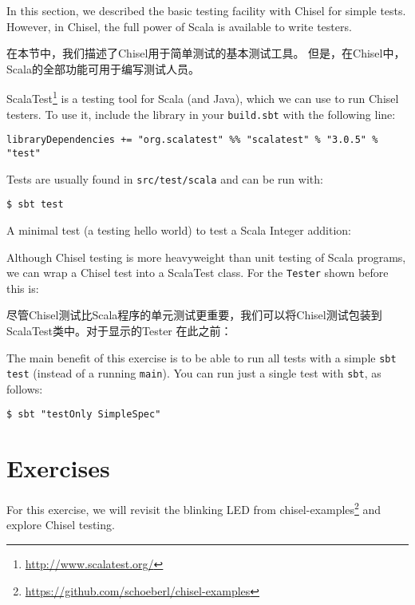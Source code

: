 \documentclass[%
    10pt,
    headinclude, footexclude,
    openright, %
    notitlepage,
    cleardoubleempty,
    headsepline,
    pointlessnumbers,
    bibtotoc, idxtotoc,
    ]{scrbook}
\newcommand{\code}[1]{{\small{\texttt{#1}}}}
\newcommand{\todo}[1]{{\emph{TODO: #1}}}
\newcommand{\myref}[2]{\href{#1}{#2}}
\renewcommand{\myref}[2]{{#2}{\footnote{\url{#1}}}}
\renewcommand{\todo}[1]{}
\begin{document}
In this section, we described the basic testing facility with Chisel for simple tests.
However, in Chisel, the full power of Scala is available to write testers.
\todo{Have a link to the not yet written section for: We will show these possibilities later.}

在本节中，我们描述了Chisel用于简单测试的基本测试工具。
但是，在Chisel中，Scala的全部功能可用于编写测试人员。

\myref{http://www.scalatest.org/}{ScalaTest} is a testing tool for Scala (and Java),
which we can use to run Chisel testers.
To use it, include the library in your \code{build.sbt} with the following line:

\begin{verbatim}
libraryDependencies += "org.scalatest" %% "scalatest" % "3.0.5" % "test"
\end{verbatim}

\noindent Tests are usually found in \code{src/test/scala} and can be run with:

\begin{verbatim}
$ sbt test
\end{verbatim}

\noindent A minimal test (a testing hello world) to test a Scala Integer
addition:


\noindent Although Chisel testing is more heavyweight than unit testing of Scala programs,
we can wrap a Chisel test into a ScalaTest class. For the \code{Tester} shown
before this is:


尽管Chisel测试比Scala程序的单元测试更重要，我们可以将Chisel测试包装到ScalaTest类中。对于显示的Tester
在此之前：


The main benefit of this exercise is to be able to run all tests with a simple
\code{sbt test} (instead of a running \code{main}). You can run just a single
test with \code{sbt}, as follows:

\begin{verbatim}
$ sbt "testOnly SimpleSpec"
\end{verbatim}

\section{Exercises}

For this exercise, we will revisit the blinking LED from
\myref{https://github.com/schoeberl/chisel-examples}{chisel-examples}
and explore Chisel testing. \todo{Also use the ALU example.}
\end{document}
